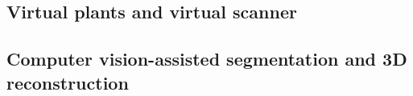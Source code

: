 \subsection{Virtual plants and virtual scanner}
\subsection{Computer vision-assisted segmentation and 3D reconstruction}